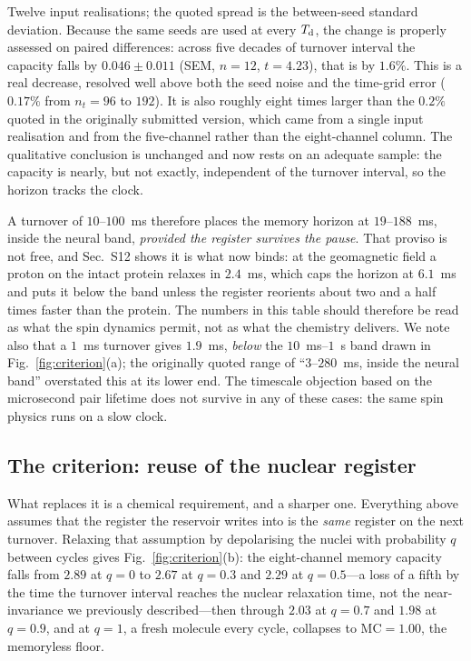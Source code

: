 \documentclass[aps,prx,reprint,superscriptaddress,nofootinbib,floatfix]{revtex4-2}
\begin{document}
Twelve input realisations; the quoted spread is the between-seed standard
deviation. Because the same seeds are used at every $T_{\rm d}$, the change is
properly assessed on paired differences: across five decades of turnover interval
the capacity falls by $0.046\pm0.011$ (SEM, $n=12$, $t=4.23$), that is by
$1.6\%$. This is a real decrease, resolved well above both the seed noise and the
time-grid error ($0.17\%$ from $n_t=96$ to $192$). It is also roughly eight times
larger than the $0.2\%$ quoted in the originally submitted version, which came
from a single input realisation and from the five-channel rather than the
eight-channel column. The qualitative conclusion is unchanged and now rests on an
adequate sample: the capacity is nearly, but not exactly, independent of the
turnover interval, so the horizon tracks the clock.

A turnover of $10$--$100$~ms therefore places the memory horizon at $19$--$188$~ms,
inside the neural band, \emph{provided the register survives the pause}. That
proviso is not free, and Sec.~S12 shows it is what now binds: at the geomagnetic
field a proton on the intact protein relaxes in $2.4$~ms, which caps the horizon
at $6.1$~ms and puts it below the band unless the register reorients about two
and a half times faster than the protein. The numbers in this table should therefore
be read as what the spin dynamics permit, not as what the chemistry delivers. We
note also that a $1$~ms turnover gives $1.9$~ms, \emph{below} the $10$~ms--$1$~s
band drawn in Fig.~\ref{fig:criterion}(a); the originally quoted range of
``$3$--$280$~ms, inside the neural band'' overstated this at its lower end. The timescale objection based on the microsecond pair
lifetime does not survive in any of these cases:
the same spin physics runs on a slow clock.

\subsection{The criterion: reuse of the nuclear register}
\label{sec:criterion}

What replaces it is a chemical requirement, and a sharper one. Everything above
assumes that the register the reservoir writes into is the \emph{same} register on
the next turnover. Relaxing that assumption by depolarising the nuclei with
probability $q$ between cycles gives Fig.~\ref{fig:criterion}(b): the
eight-channel memory capacity falls from $2.89$ at $q=0$ to $2.67$ at $q=0.3$ and
$2.29$ at $q=0.5$---a loss of a fifth by the time the turnover interval reaches
the nuclear relaxation time, not the near-invariance we previously described---then
through $2.03$ at $q=0.7$ and $1.98$ at $q=0.9$, and at $q=1$, a fresh molecule
every cycle, collapses to $\mathrm{MC}=1.00$, the memoryless floor.
\end{document}
